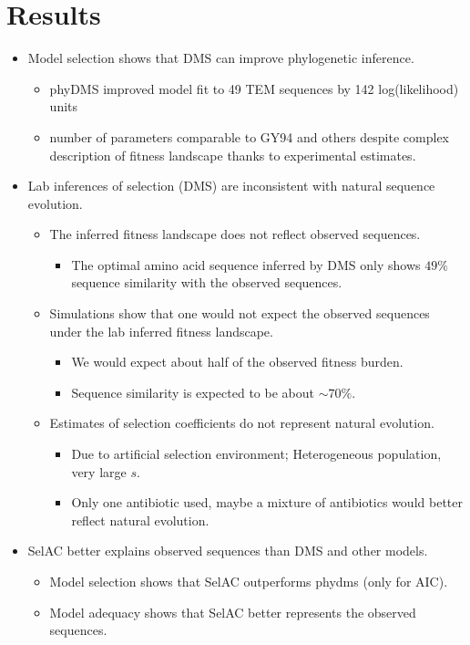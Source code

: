 \documentclass[12pt]{article}
\begin{document}
\section*{Results}

\begin{itemize}
 \item Model selection shows that DMS can improve phylogenetic inference.
 \begin{itemize}
   \item phyDMS improved model fit to 49 TEM sequences by 142 log(likelihood) units
   \item number of parameters comparable to GY94 and others despite complex description of fitness landscape thanks to experimental estimates.
 \end{itemize}
  
  
 \item Lab inferences of selection (DMS) are inconsistent with natural sequence evolution.
 \begin{itemize}
   \item The inferred fitness landscape does not reflect observed sequences.
   \begin{itemize}
    \item The optimal amino acid sequence inferred by DMS only shows $49 \%$ sequence similarity with the observed sequences.
   \end{itemize}
 \item Simulations show that one would not expect the observed sequences under the lab inferred fitness landscape.
   \begin{itemize}
    \item We would expect about half of the observed fitness burden.
    \item Sequence similarity is expected to be about $\sim 70 \%$.
   \end{itemize}
 \item Estimates of selection coefficients do not represent natural evolution.
   \begin{itemize}
    \item Due to artificial selection environment; Heterogeneous population, very large $s$. 
    \item Only one antibiotic used, maybe a mixture of antibiotics would better reflect natural evolution.
   \end{itemize}
 \end{itemize}
 
 \item SelAC better explains observed sequences than DMS and other models.
 \begin{itemize}
  \item Model selection shows that SelAC outperforms phydms (only for AIC).
  \item Model adequacy shows that SelAC better represents the observed sequences.
 \end{itemize}
 

\end{itemize}
\end{document}
